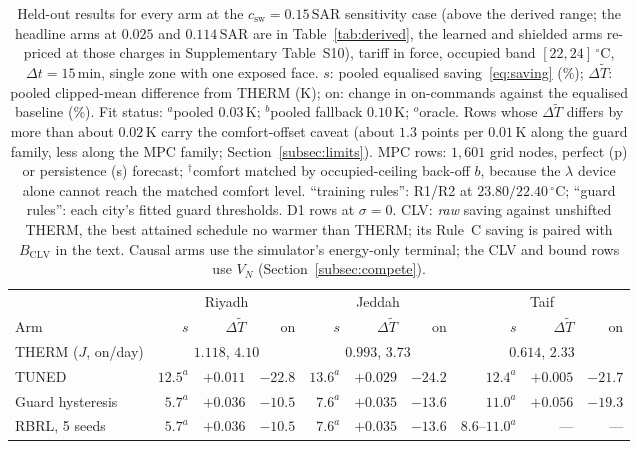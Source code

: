 \documentclass[pdflatex,sn-mathphys-num,iicol]{sn-jnl}
\theoremstyle{thmstyleone}\newtheorem{proposition}{Proposition}\newtheorem{corollary}{Corollary}
\theoremstyle{thmstyletwo}\newtheorem{remark}{Remark}\newtheorem{observation}{Observation}
\theoremstyle{thmstylethree}\newtheorem{definition}{Definition}
\newcommand{\csw}{c_{\mathrm{sw}}}
\newcommand{\SAR}{\text{SAR}}
\begin{document}
\begin{table}[t]
\centering
\caption{Held-out results for every arm at the $\csw=0.15\,\SAR$ sensitivity case (above the derived range; the headline arms at $0.025$ and $0.114\,\SAR$ are in Table~\ref{tab:derived}, the learned and shielded arms re-priced at those charges in Supplementary Table~S10), tariff in force, occupied band $[22,24]\,^\circ$C, $\Delta t=15\,$min, single zone with one exposed face. $s$: pooled equalised saving~\eqref{eq:saving} (\%);
$\Delta\tilde T$: pooled clipped-mean difference from THERM (K); on: change
in on-commands against the equalised baseline (\%). Fit status:
$^{a}$pooled $0.03\,$K; $^{b}$pooled fallback $0.10\,$K; $^{o}$oracle. Rows
whose $\Delta\tilde T$ differs by more than about $0.02\,$K carry the
comfort-offset caveat (about $1.3$ points per $0.01\,$K along the guard
family, less along the MPC family; Section~\ref{subsec:limits}). MPC rows: $1{,}601$ grid nodes, perfect (p) or
persistence (s) forecast; $^{\dagger}$comfort matched by occupied-ceiling
back-off $b$, because the $\lambda$ device alone cannot reach the matched
comfort level. ``training rules'': R1/R2 at $23.80/22.40\,^\circ$C; ``guard
rules'': each city's fitted guard thresholds. D1 rows at $\sigma=0$. CLV:
\emph{raw} saving against unshifted THERM, the best attained schedule no
warmer than THERM; its Rule~C saving is paired with $B_{\mathrm{CLV}}$ in the
text. Causal arms use the simulator's energy-only terminal; the CLV and bound
rows use $V_N$ (Section~\ref{subsec:compete}).}
\label{tab:main}
\setlength{\tabcolsep}{1.5pt}
\footnotesize
\begin{tabular*}{\textwidth}{@{\extracolsep{\fill}}lrrrrrrrrr@{}}
\toprule
 & \multicolumn{3}{c}{Riyadh} & \multicolumn{3}{c}{Jeddah} & \multicolumn{3}{c}{Taif} \\
\cmidrule(lr){2-4}\cmidrule(lr){5-7}\cmidrule(lr){8-10}
Arm & $s$ & $\Delta\tilde T$ & on & $s$ & $\Delta\tilde T$ & on & $s$ & $\Delta\tilde T$ & on \\
\midrule
THERM ($J$, on/day) & \multicolumn{3}{c}{$1.118$, $4.10$} & \multicolumn{3}{c}{$0.993$, $3.73$} & \multicolumn{3}{c}{$0.614$, $2.33$} \\
TUNED & $12.5^{a}$ & $+0.011$ & $-22.8$ & $13.6^{a}$ & $+0.029$ & $-24.2$ & $12.4^{a}$ & $+0.005$ & $-21.7$ \\
Guard hysteresis & $5.7^{a}$ & $+0.036$ & $-10.5$ & $7.6^{a}$ & $+0.035$ & $-13.6$ & $11.0^{a}$ & $+0.056$ & $-19.3$ \\
RBRL, 5 seeds & $5.7^{a}$ & $+0.036$ & $-10.5$ & $7.6^{a}$ & $+0.035$ & $-13.6$ & $8.6$--$11.0^{a}$ & --- & --- \\

\end{tabular*}
\end{table}
\end{document}
